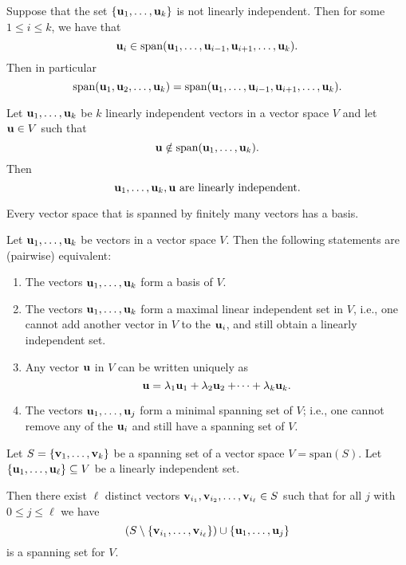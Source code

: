 \documentclass[10pt, a4paper]{article}
\begin{document}
\begin{lemma}
    Suppose that the set $\{\mathbf{u}_1, \dotsc, \mathbf{u}_k\}$ is not linearly independent.
    Then for some $1 \leq i \leq k$,
    we have that
    \[
    \mathbf{u}_i \in \mathrm{span}(\mathbf{u}_1, \dotsc, \mathbf{u}_{i - 1}, \mathbf{u}_{i + 1}, \dotsc, \mathbf{u}_k).
    \]
    Then in particular
    \[
    \mathrm{span}(\mathbf{u}_1, \mathbf{u}_2, \dotsc, \mathbf{u}_k) = \mathrm{span}(\mathbf{u}_1, \dotsc, \mathbf{u}_{i - 1}, \mathbf{u}_{i + 1}, \dotsc, \mathbf{u}_k).
    \]
\end{lemma}

\begin{lemma}
    Let $\mathbf{u}_1, \dotsc, \mathbf{u}_k$ be $k$ linearly independent vectors in a vector space $V$ and let $\mathbf{u} \in V$ such that
    \[
    \mathbf{u} \notin \mathrm{span}(\mathbf{u}_1, \dotsc, \mathbf{u}_k).
    \]
    Then
    \[
    \mathbf{u}_1, \dotsc, \mathbf{u}_k, \mathbf{u}\text{ are linearly independent}.
    \]
\end{lemma}

\begin{theorem}
    Every vector space that is spanned by finitely many vectors has a basis.
\end{theorem}

\begin{theorem}
    Let $\mathbf{u}_1, \dotsc, \mathbf{u}_k$ be vectors in a vector space $V$.
    Then the following statements are
    (pairwise)
    equivalent:
    \begin{enumerate}[label = (\roman*)]
        \item The vectors $\mathbf{u}_1, \dotsc, \mathbf{u}_k$ form a basis of $V$.
        \item The vectors $\mathbf{u}_1, \dotsc, \mathbf{u}_k$ form a maximal linear independent set in $V$,
        i.e., one cannot add another vector in $V$ to the $\mathbf{u}_i$,
        and still obtain a linearly independent set.
        \item Any vector $\mathbf{u}$ in $V$ can be written uniquely as
        \[
        \mathbf{u} = \lambda_1\mathbf{u}_1 + \lambda_2\mathbf{u}_2 + \dotsi + \lambda_k\mathbf{u}_k.
        \]
        \item The vectors $\mathbf{u}_1, \dotsc, \mathbf{u}_j$ form a minimal spanning set of $V$;
        i.e., one cannot remove any of the $\mathbf{u}_i$ and still have a spanning set of $V$.
    \end{enumerate}
\end{theorem}

\begin{theorem}
    Let $S = \{\mathbf{v}_1, \dotsc, \mathbf{v}_k\}$ be a spanning set of a vector space $V = \mathrm{span}(S)$.
    Let $\{\mathbf{u}_1, \dotsc, \mathbf{u}_{\ell}\} \subseteq V$ be a linearly independent set.

    Then there exist $\ell$ distinct vectors $\mathbf{v}_{i_1}, \mathbf{v}_{i_2}, \dotsc, \mathbf{v}_{i_{\ell}} \in S$ such that for all $j$ with $0 \leq j \leq \ell$ we have
    \[
    (S \setminus \{\mathbf{v}_{i_1}, \dotsc, \mathbf{v}_{i_{\ell}}\}) \cup \{\mathbf{u}_1, \dotsc, \mathbf{u}_j\}
    \]
    is a spanning set for $V$.
\end{theorem}
\end{document}
